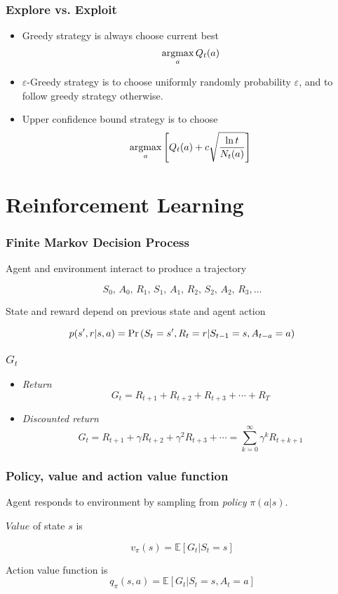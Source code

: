 \documentclass{beamer}
\begin{document}
\frame
{
   \frametitle{Explore vs. Exploit}

   \begin{itemize}
      \item<1-> Greedy strategy is always choose current best 
      $$\operatorname*{argmax}_a Q_t(a)$$
      
      \item<2-> $\varepsilon$-Greedy strategy is to choose uniformly randomly
      probability $\varepsilon$, and to follow greedy strategy otherwise.
      
      \item<3-> Upper confidence bound strategy is to choose
      $$\operatorname*{argmax}_a \left[{Q_t(a) + c \sqrt{\frac{\ln t}{N_t(a)}}}\right]$$
      
   \end{itemize}
}

\section{Reinforcement Learning}

\frame
{
   \frametitle{Finite Markov Decision Process}
   
   Agent and environment interact to produce a trajectory
   
   $$S_0,\,A_0,\,R_1,\,S_1,\,A_1,\,R_2,\,S_2,\,A_2,\,R_3,\dots$$
   
   State and reward depend on previous state and agent action
   
   $$p(s', r | s, a) = \Pr \left({S_t=s', R_t=r | S_{t-1}=s,A_{t-a}=a}\right)$$
}

\frame
{
   \frametitle{$G_t$}

   \begin{itemize}
      \item<1-> \textit{Return}
      $$G_t = R_{t+1} + R_{t+2} + R_{t+3} + \cdots + R_T$$

      \item<2-> \textit{Discounted return}
      $$G_t = R_{t+1} + \gamma R_{t+2} + \gamma^2 R_{t+3} + \cdots = \sum^\infty_{k=0} \gamma ^k R_{t+k+1}$$

   \end{itemize}
}

\frame
{
   \frametitle{Policy, value and action value function}
   
   Agent responds to environment by sampling from \textit{policy} $\pi(a|s)$.
   
   $Value$ of state $s$ is
   
   $$v_\pi (s) = \mathbb{E} [G_t|S_t = s]$$
   
   Action value function is
   $$q_\pi(s, a) = \mathbb{E} [G_t|S_t = s, A_t = a]$$ 
}
\end{document}
